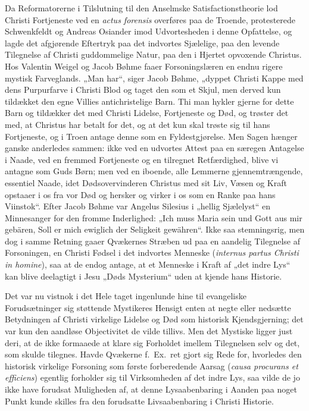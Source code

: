 \documentclass[12pt]{book}
\begin{document}
Da Reformatorerne i Tilslutning til den Anselmske
Satisfactionstheorie lod Christi Fortjeneste ved en \textit{actus
forensis} overføres paa de Troende, protesterede Schwenkfeldt og
Andreas Osiander imod Udvortesheden i denne Opfattelse, og lagde det
afgjørende Eftertryk paa det indvortes Sjælelige, paa den levende
Tilegnelse af Christi guddommelige Natur, paa den i Hjertet
opvoxende Christus. Hos Valentin Weigel og Jacob Bøhme faaer
Forsoningslæren en endnu rigere mystisk Farveglands. „Man har“,
siger Jacob Bøhme, „dyppet Christi Kappe med dens Purpurfarve i
Christi Blod og taget den som et Skjul, men derved kun tildækket den
egne Villies antichristelige Barn. Thi man hykler gjerne for dette
Barn og tildækker det med Christi Lidelse, Fortjeneste og Død, og
trøster det med, at Christus har betalt for det, og at det kun skal
trøste sig til hans Fortjeneste, og i Troen antage denne som en
Fyldestgjørelse. Men Sagen hænger ganske anderledes sammen: ikke ved
en udvortes Attest paa en særegen Antagelse i Naade, ved en fremmed
Fortjeneste og en tilregnet Retfærdighed, blive vi antagne som Guds
Børn; men ved en iboende, alle Lemmerne gjennemtrængende, essentiel
Naade, idet Dødsovervinderen Christus med sit Liv, Væsen og Kraft
opstaaer i os fra vor Død og hersker og virker i os som en Ranke paa
hans Viinstok“. Efter Jacob Bøhme var Angelus Silesius i „hellig
Sjælelyst“ en Minnesanger for den fromme Inderlighed: „Ich muss
Maria sein und Gott aus mir gebären, Soll er mich ewiglich der
Seligkeit gewähren“. Ikke saa stemningsrig, men dog i samme Retning
gaaer Qvækernes Stræben ud paa en aandelig Tilegnelse af
Forsoningen, en Christi Fødsel i det indvortes Menneske
(\textit{internus partus Christi in homine}), saa at de endog
antage, at et Menneske i Kraft af „det indre Lys“ kan blive
deelagtigt i Jesu „Døds Mysterium“ uden at kjende hans Historie.

Det var nu vistnok i det Hele taget ingenlunde hine
til evangeliske Forudsætninger sig støttende Mystikeres Hensigt
enten at negte eller nedsætte Betydningen af Christi virkelige
Lidelse og Død som historisk Kjendsgjerning; det var kun den
aandløse Objectivitet de vilde tillivs. Men det Mystiske ligger just
deri, at de ikke formaaede at klare sig Forholdet imellem
Tilegnelsen selv og det, som skulde tilegnes. Havde Qvækerne
f.\ Ex.\ ret gjort sig Rede for, hvorledes den historisk virkelige
Forsoning som første forberedende Aarsag (\textit{causa procurans et
efficiens}) egentlig forholder sig til Virksomheden af det indre
Lys, saa vilde de jo ikke have forudsat Muligheden af, at denne
Lysaabenbaring i Aanden paa noget Punkt kunde skilles fra den
forudsatte Livsaabenbaring i Christi Historie.
\end{document}
